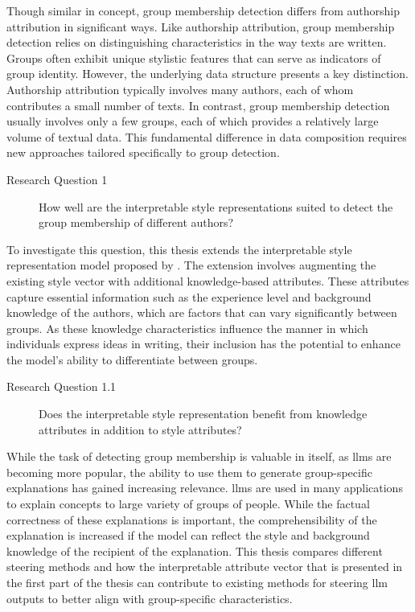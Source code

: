 Though similar in concept, group membership detection differs from authorship attribution in significant ways. Like authorship attribution, group membership detection relies on distinguishing characteristics in the way texts are written. Groups often exhibit unique stylistic features that can serve as indicators of group identity. However, the underlying data structure presents a key distinction. Authorship attribution typically involves many authors, each of whom contributes a small number of texts. In contrast, group membership detection usually involves only a few groups, each of which provides a relatively large volume of textual data. This fundamental difference in data composition requires new approaches tailored specifically to group detection.

\begin{description}
  \item[Research Question 1] How well are the interpretable style representations suited to detect the group membership of different authors?
\end{description}

To investigate this question, this thesis extends the interpretable style representation model proposed by \citet{patelLearningInterpretableStyle2023}. The extension involves augmenting the existing style vector with additional knowledge-based attributes. These attributes capture essential information such as the experience level and background knowledge of the authors, which are factors that can vary significantly between groups. As these knowledge characteristics influence the manner in which individuals express ideas in writing, their inclusion has the potential to enhance the model's ability to differentiate between groups.

\begin{description}
  \item[Research Question 1.1] Does the interpretable style representation benefit from knowledge attributes in addition to style attributes?
\end{description}

While the task of detecting group membership is valuable in itself, as \aclp{llm} are becoming more popular, the ability to use them to generate group-specific explanations has gained increasing relevance. \acp{llm} are used in many applications to explain concepts to large variety of groups of people. While the factual correctness of these explanations is important, the comprehensibility of the explanation is increased if the model can reflect the style and background knowledge of the recipient of the explanation. This thesis compares different steering methods and how the interpretable attribute vector that is presented in the first part of the thesis can contribute to existing methods for steering \ac{llm} outputs to better align with group-specific characteristics.

